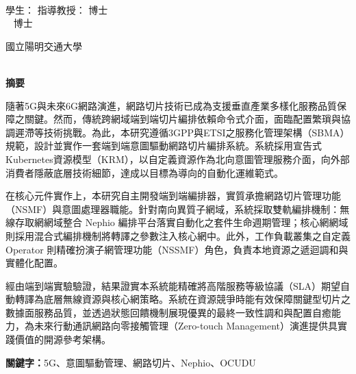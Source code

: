 \begin{center}
    \large
    \begin{singlespace}    
        \textbf{\chineseTitle{}} \\[0.5cm]
    \end{singlespace}

    \begin{singlespace}    
    學生：\studentCnName  \hspace{2.5cm}  指導教授：\advisorCnName \hspace{0.1cm} 博士 \\

    \ifdefined\advisorCnNameB %
        \hspace{9.6cm}  \advisorCnNameB ~ 博士 \\
    \fi
    \end{singlespace}

    \vspace{0.5cm}

    \begin{singlespace}
        國立陽明交通大學\\
        \NameofDepartmentInstituteCN\\[0.2cm]
    \end{singlespace}

    \textbf{摘\hspace{1cm}要} \\[0.5cm]

\end{center}

\normalsize 

隨著5G與未來6G網路演進，網路切片技術已成為支援垂直產業多樣化服務品質保障之關鍵。然而，傳統跨網域端到端切片編排依賴命令式介面，面臨配置繁瑣與協調遲滯等技術挑戰。為此，本研究遵循3GPP與ETSI之服務化管理架構（SBMA）規範，設計並實作一套端到端意圖驅動網路切片編排系統。系統採用宣告式Kubernetes資源模型（KRM），以自定義資源作為北向意圖管理服務介面，向外部消費者隱蔽底層技術細節，達成以目標為導向的自動化運維範式。

在核心元件實作上，本研究自主開發端到端編排器，實質承擔網路切片管理功能（NSMF）與意圖處理器職能。針對南向異質子網域，系統採取雙軌編排機制：無線存取網網域整合 Nephio 編排平台落實自動化之套件生命週期管理；核心網網域則採用混合式編排機制將轉譯之參數注入核心網中。此外，工作負載叢集之自定義 Operator 則精確扮演子網管理功能（NSSMF）角色，負責本地資源之遞迴調和與實體化配置。

經由端到端實驗驗證，結果證實本系統能精確將高階服務等級協議（SLA）期望自動轉譯為底層無線資源與核心網策略。系統在資源競爭時能有效保障關鍵型切片之數據面服務品質，並透過狀態回饋機制展現優異的最終一致性調和與配置自癒能力，為未來行動通訊網路向零接觸管理（Zero-touch Management）演進提供具實踐價值的開源參考架構。

\vspace{1cm}

\textbf{關鍵字：}5G、意圖驅動管理、網路切片、Nephio、OCUDU
